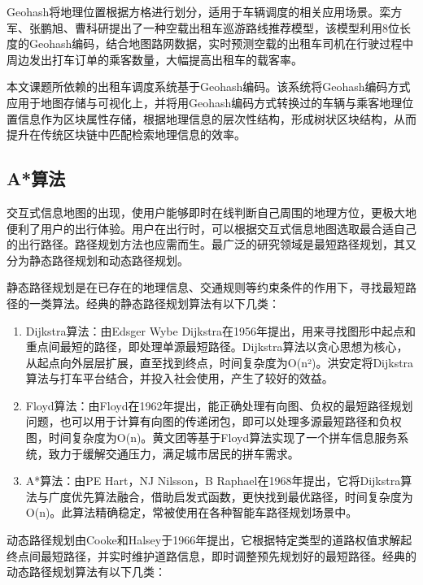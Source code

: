 Geohash将地理位置根据方格进行划分，适用于车辆调度的相关应用场景。栾方军、张鹏旭、曹科研提出了一种空载出租车巡游路线推荐模型，该模型利用8位长度的Geohash编码，结合地图路网数据，实时预测空载的出租车司机在行驶过程中周边发出打车订单的乘客数量，大幅提高出租车的载客率\cite{栾方军2020Geohash}。

本文课题所依赖的出租车调度系统基于Geohash编码。该系统将Geohash编码方式应用于地图存储与可视化上，并将用Geohash编码方式转换过的车辆与乘客地理位置信息作为区块属性存储，根据地理信息的层次性结构，形成树状区块结构，从而提升在传统区块链中匹配检索地理信息的效率。

\subsection{A*算法}

\space 交互式信息地图的出现，使用户能够即时在线判断自己周围的地理方位，更极大地便利了用户的出行体验。用户在出行时，可以根据交互式信息地图选取最合适自己的出行路径。路径规划方法也应需而生。最广泛的研究领域是最短路径规划，其又分为静态路径规划和动态路径规划。

\space 静态路径规划是在已存在的地理信息、交通规则等约束条件的作用下，寻找最短路径的一类算法。经典的静态路径规划算法有以下几类：

\begin{enumerate}
    \item Dijkstra算法：由Edsger Wybe Dijkstra在1956年提出，用来寻找图形中起点和重点间最短的路径\cite{1959A}，即处理单源最短路径。Dijkstra算法以贪心思想为核心，从起点向外层层扩展，直至找到终点，时间复杂度为O(n²)。洪安定将Dijkstra算法与打车平台结合，并投入社会使用，产生了较好的效益\cite{洪安定基于优化司乘匹配的区域网约车平台设计与实现}。
    \item Floyd算法：由Floyd在1962年提出\cite{1962Algorithm}，能正确处理有向图、负权的最短路径规划问题，也可以用于计算有向图的传递闭包，即可以处理多源最短路径和负权图，时间复杂度为O(n)。黄文团等基于Floyd算法实现了一个拼车信息服务系统，致力于缓解交通压力，满足城市居民的拼车需求\cite{黄文团2011}。
    \item A*算法：由PE Hart，NJ Nilsson，B Raphael在1968年提出\cite{1972A}，它将Dijkstra算法与广度优先算法融合，借助启发式函数，更快找到最优路径，时间复杂度为O(n)。此算法精确稳定，常被使用在各种智能车路径规划场景中。
\end{enumerate}

\space 动态路径规划由Cooke和Halsey于1966年提出\cite{1966The}，它根据特定类型的道路权值求解起终点间最短路径，并实时维护道路信息，即时调整预先规划好的最短路径。经典的动态路径规划算法有以下几类：

